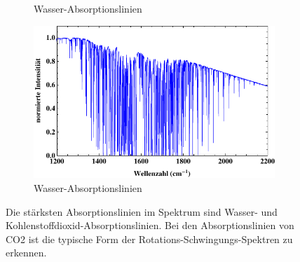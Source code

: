 \documentclass[paper=a4,fontsize=10pt,DIV=18,twocolumn,parskip=half]{scrartcl}
\numberwithin{equation}{section}    %
\begin{document}
\begin{figure}
\begin{subfigure}{\columnwidth}
        \caption{Wasser-Absorptionslinien}
        \label{Luft4}
    \end{subfigure}
        \begin{subfigure}{\columnwidth}
        \includegraphics[width=\textwidth]{Bilder/Luft5}
        \caption{Wasser-Absorptionslinien}
        \label{Luft5}
    \end{subfigure}
    \caption{Die stärksten Absorptionslinien im Spektrum sind Wasser- und Kohlenstoffdioxid-Absorptionslinien. Bei den Absorptionslinien von CO2 ist die typische Form der Rotations-Schwingungs-Spektren zu erkennen.}
    \label{brechzahlen}
\end{figure}
\end{document}

